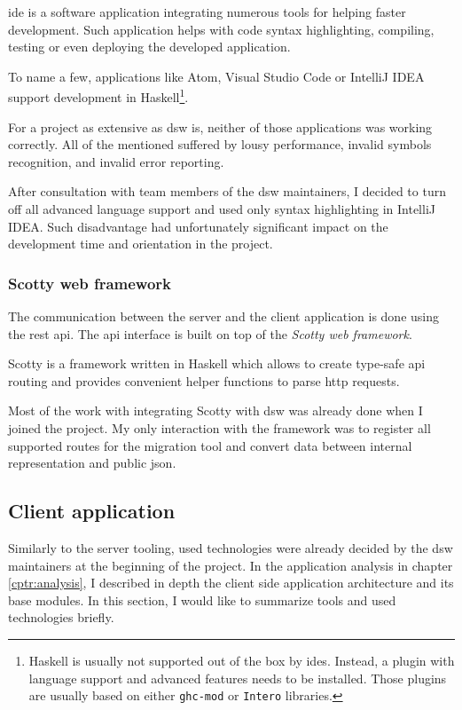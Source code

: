\gls{ide} is a software application integrating numerous tools for helping faster development\cite{ssq-ide}.
Such application helps with code syntax highlighting, compiling, testing or even deploying the developed application.

To name a few, applications like Atom, Visual Studio Code or IntelliJ IDEA support development in Haskell\footnote{Haskell is usually not supported out of the box by \gls{ide}s. Instead, a plugin with language support and advanced features needs to be installed. Those plugins are usually based on either \texttt{ghc-mod} or \texttt{Intero} libraries.}.

For a project as extensive as \gls{dsw} is, neither of those applications was working correctly.
All of the mentioned suffered by lousy performance, invalid symbols recognition, and invalid error reporting.

After consultation with team members of the \gls{dsw} maintainers, I decided to turn off all advanced language support and used only syntax highlighting in IntelliJ IDEA.
Such disadvantage had unfortunately significant impact on the development time and orientation in the project.

\subsubsection*{Scotty web framework}

The communication between the server and the client application is done using the \gls{rest} \gls{api}.
The \gls{api} interface is built on top of the \textit{Scotty web framework}.

Scotty is a framework written in Haskell which allows to create type-safe \gls{api} routing and provides convenient helper functions to parse \gls{http} requests.

Most of the work with integrating Scotty with \gls{dsw} was already done when I joined the project.
My only interaction with the framework was to register all supported routes for the migration tool and convert data between internal representation and public \gls{json}.

\subsection{Client application}

Similarly to the server tooling, used technologies were already decided by the \gls{dsw} maintainers at the beginning of the project.
In the application analysis in chapter \ref{cptr:analysis}, I described in depth the client side application architecture and its base modules.
In this section, I would like to summarize tools and used technologies briefly.

